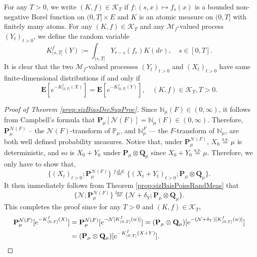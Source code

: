 \documentclass[UTF8]{pkuthss}
\theoremstyle{plain}
\theoremstyle{definition}
\numberwithin{equation}{section}
\begin{document}
	For any $T>0$, we write $(K,f)\in \mathcal K_T$ if $f: (s,x) \mapsto f_s(x)$ is a bounded non-negative Borel function on $(0,T] \times E$ and $K$ is an atomic measure on $(0,T]$ with finitely many atoms.
	For any $(K,f)\in\mathcal K_T$ and any $\mathcal M_f$-valued  process $(Y_t)_{t> 0}$, we define the random variable
\[	
	K_{(s, T]}^f(Y)
	:= \int_{(s,T]} Y_{r-s}(f_r) K(dr),
	\quad s\in [0,T].
\]	
	It is clear that the two $\mathcal M_f$-valued processes $(Y_t)_{t>0}$ and $(X_t)_{t>0}$ have same finite-dimensional distributions if and only if
\[
	\mathbf E[e^{-K_{(0,T]}^f(X)}]
	=\mathbf E[e^{-K^f_{(0,T]}(Y)}],
	\quad (K,f)\in \mathcal K_T, T>0.
\]

\begin{proof}[Proof of Theorem \ref{prop:sizBiasDecSupProc}]
	Since $\mathbb N_\mu(F) \in (0,\infty)$, it follows from Campbell's formula that $\mathbf P_\mu[\mathcal N(F)] = \mathbb N_\mu(F) \in (0,\infty)$.
	Therefore, $\mathbf P_\mu^{\mathcal N(F)}$ -- the $\mathcal N(F)$-transform of $\mathbb P_\mu$, and $\mathbb N_\mu^F$ --- the $F$-transform of $\mathbb N_\mu$, are both well defined probability measures.
	Notice that, under $\mathbf P_\mu^{\mathcal N(F)}$, $X_0\overset{\text{a.s.}}{=}\mu$ is deterministic,
	and so is $X_0+Y_0$ under  $\mathbf P_\mu \otimes \mathbf Q_\mu$ since $X_0+Y_0\overset{\text{a.s.}}=\mu$.
	Therefore, we only have to show that,
\[
	\{(X_t)_{t > 0}; \mathbf P_{\mu}^{\mathcal N(F)}\}
	\overset{f.d.d.}{=} \{(X_t + Y_t)_{t > 0}; \mathbf P_\mu\otimes \mathbf Q_\mu\}.
\]
	It then immediately follows from Theorem \ref{prop:sizBaisPoissRandMeas} that
\[
	\{\mathcal N; \mathbf P^{\mathcal N(F)}_\mu\}
	\overset{law}{=} \{\mathcal N + \delta_Y; \mathbf P_\mu\otimes \mathbf Q_\mu\}.
\]
	This completes the proof since for any $T > 0$ and $(K,f) \in \mathcal K_T$,
\[\begin{split}
	\mathbf P_\mu^{\mathcal N(F)} [e^{-K_{(0, T]}^f(X)}]
	&= \mathbf P_\mu^{\mathcal N(F)} [e^{-\mathcal N[K_{(0, T]}^f(w)]}]
	= (\mathbf P_\mu\otimes \mathbf Q_\mu) [e^{-(\mathcal N+\delta_Y)[K_{(0, T]}^f(w)]}]\\
	&= (\mathbf P_\mu\otimes \mathbf Q_\mu) [e^{-K_{(0, T]}^f(X+Y)}].
	\qedhere
\end{split}\]
\end{proof}
\end{document}
